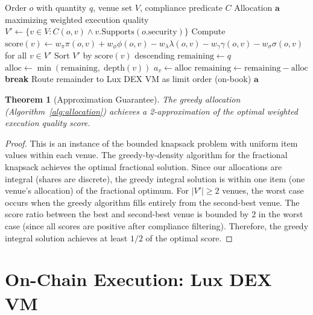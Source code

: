 \documentclass[11pt,a4paper]{article}
\newtheorem{theorem}{Theorem}
\begin{document}
\begin{algorithm}[H]
\caption{Greedy order allocation across venues.}
\label{alg:allocation}
\begin{algorithmic}[1]
\Require Order $o$ with quantity $q$, venue set $V$, compliance predicate $C$
\Ensure Allocation $\mathbf{a}$ maximizing weighted execution quality
\State $V' \gets \{v \in V : C(o, v) \land v.\text{Supports}(o.\text{security})\}$
\State Compute $\text{score}(v) \gets w_\pi \pi(o,v) + w_\phi \phi(o,v) - w_\lambda \lambda(o,v) - w_\gamma \gamma(o,v) - w_\sigma \sigma(o,v)$ for all $v \in V'$
\State Sort $V'$ by $\text{score}(v)$ descending
\State $\text{remaining} \gets q$
  \State $\text{alloc} \gets \min(\text{remaining},\; \text{depth}(v))$
  \State $a_v \gets \text{alloc}$
  \State $\text{remaining} \gets \text{remaining} - \text{alloc}$
    \State \textbf{break}
  \EndIf
\EndFor
{}
  \State Route remainder to Lux DEX VM as limit order (on-book)
\EndIf
\State \Return $\mathbf{a}$
\end{algorithmic}
\end{algorithm}

\begin{theorem}[Approximation Guarantee]
The greedy allocation (Algorithm~\ref{alg:allocation}) achieves a 2-approximation of the optimal weighted execution quality score.
\end{theorem}

\begin{proof}
This is an instance of the bounded knapsack problem with uniform item values within each venue. The greedy-by-density algorithm for the fractional knapsack achieves the optimal fractional solution. Since our allocations are integral (shares are discrete), the greedy integral solution is within one item (one venue's allocation) of the fractional optimum. For $|V'| \geq 2$ venues, the worst case occurs when the greedy algorithm fills entirely from the second-best venue. The score ratio between the best and second-best venue is bounded by 2 in the worst case (since all scores are positive after compliance filtering). Therefore, the greedy integral solution achieves at least $1/2$ of the optimal score.
\end{proof}

\section{On-Chain Execution: Lux DEX VM}\label{sec:dex}
\end{document}
